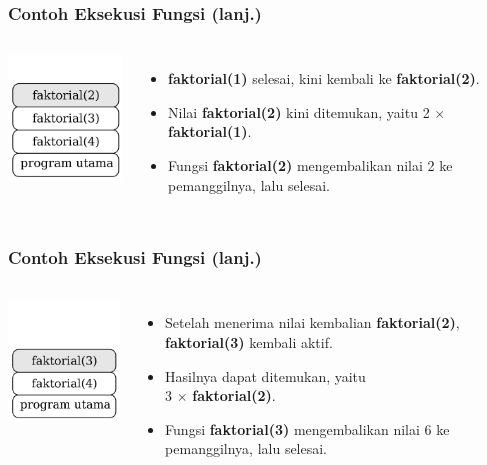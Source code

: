 \begin{frame}
\frametitle{Contoh Eksekusi Fungsi (lanj.)}
\begin{columns}
    \centering
    \includegraphics[width=4cm]{asset/rekursi-4.pdf}
    \begin{itemize}
      \item \textbf{faktorial(1)} selesai, kini kembali ke \textbf{faktorial(2)}.
      \item Nilai \textbf{faktorial(2)} kini ditemukan, yaitu 2 $\times$ \textbf{faktorial(1)}.
      \item Fungsi \textbf{faktorial(2)} mengembalikan nilai 2 ke pemanggilnya, lalu selesai.
    \end{itemize}
  \end{columns} 
\end{frame}

\begin{frame}
\frametitle{Contoh Eksekusi Fungsi (lanj.)}
\begin{columns}
    \centering
    \includegraphics[width=4cm]{asset/rekursi-3.pdf}
    \begin{itemize}
      \item Setelah menerima nilai kembalian \textbf{faktorial(2)}, \textbf{faktorial(3)} kembali aktif.
      \item Hasilnya dapat ditemukan, yaitu \\ 3 $\times$ \textbf{faktorial(2)}.
      \item Fungsi \textbf{faktorial(3)} mengembalikan nilai 6 ke pemanggilnya, lalu selesai.
    \end{itemize}
  \end{columns} 
\end{frame}

